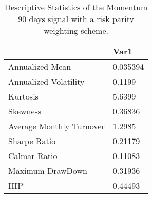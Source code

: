 \begin{table}[H]
\centering
\begin{tabular}{ll}
& Var1 \\ 
\hline 
Annualized Mean & 0.035394 \\ 
Annualized Volatility & 0.1199 \\ 
Kurtosis & 5.6399 \\ 
Skewness & 0.36836 \\ 
Average Monthly Turnover & 1.2985 \\ 
Sharpe Ratio & 0.21179 \\ 
Calmar Ratio & 0.11083 \\ 
Maximum DrawDown & 0.31936 \\ 
HH* & 0.44493 \\ 
\hline
\end{tabular}
\caption{Descriptive Statistics of the Momentum 90 days signal with a risk parity weighting scheme.}
\label{MOM90RP}
\end{table}